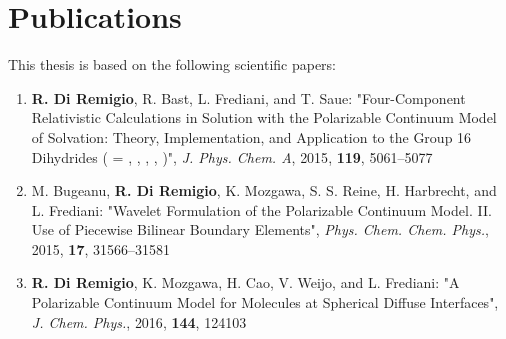 \thispagestyle{empty}
\chapter*{Publications}%

This thesis is based on the following scientific papers:

\begin{enumerate}[label=\textbf{\Roman{*} },ref=\Roman{*}]

\item
  \textbf{R. Di Remigio}, R. Bast, L. Frediani, and T. Saue:
  "Four-Component Relativistic Calculations in Solution with the
  Polarizable Continuum Model of Solvation: Theory,
  Implementation, and Application to the Group 16 Dihydrides
   ( = , , , ,
  )",
\textit{J. Phys. Chem. A}, \textrm{2015}, \textbf{119}, 5061--5077
\label{relapcm}

\item
  M. Bugeanu, \textbf{R. Di Remigio}, K. Mozgawa, S. S. Reine, H.
  Harbrecht,  and L. Frediani:
  "Wavelet Formulation of the Polarizable Continuum Model. II. Use of
  Piecewise Bilinear Boundary Elements",
  \textit{Phys. Chem. Chem. Phys.}, \textrm{2015}, \textbf{17},
  31566--31581
\label{wemlin}

\item \textbf{R. Di Remigio}, K. Mozgawa, H. Cao, V. Weijo, and L.
  Frediani:
  "A Polarizable Continuum Model for Molecules at Spherical
  Diffuse Interfaces",
  \textit{J. Chem. Phys.}, \textrm{2016}, \textbf{144}, 124103
\label{spherical}

\end{enumerate}
